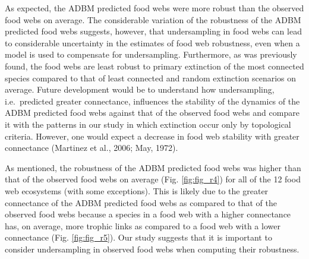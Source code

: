 \documentclass{article}
\begin{document}
As expected, the ADBM predicted food webs were more robust than the
observed food webs on average. The considerable variation of the
robustness of the ADBM predicted food webs suggests, however, that
undersampling in food webs can lead to considerable uncertainty in the
estimates of food web robustness, even when a model is used to
compensate for undersampling. Furthermore, as was previously found, the
food webs are least robust to primary extinction of the most connected
species compared to that of least connected and random extinction
scenarios on average. Future development would be to understand how
undersampling, i.e.~predicted greater connectance, influences the
stability of the dynamics of the ADBM predicted food webs against that
of the observed food webs and compare it with the patterns in our study
in which extinction occur only by topological criteria. However, one
would expect a decrease in food web stability with greater connectance
(Martinez et al., 2006; May, 1972).

As mentioned, the robustness of the ADBM predicted food webs was higher
than that of the observed food webs on average (Fig. \ref{fig:fig_r4})
for all of the 12 food web ecosystems (with some exceptions). This is
likely due to the greater connectance of the ADBM predicted food webs as
compared to that of the observed food webs because a species in a food
web with a higher connectance has, on average, more trophic links as
compared to a food web with a lower connectance (Fig. \ref{fig:fig_r5}).
Our study suggests that it is important to consider undersampling in
observed food webs when computing their robustness.
\end{document}

